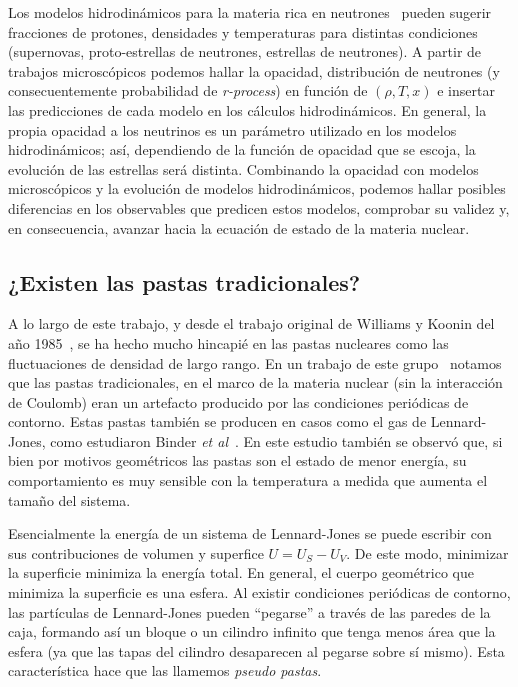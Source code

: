 Los modelos hidrodinámicos para la materia rica en neutrones~\cite{ruffert_coalescing_1995, mezzacappa_investigation_1998, geppert_temperature_2004, woosley_physics_2005, liebendorfer_supernova_2005} pueden sugerir fracciones de protones, densidades y temperaturas para distintas condiciones (supernovas, proto-estrellas de neutrones, estrellas de neutrones).
A partir de trabajos microscópicos podemos hallar la opacidad, distribución de neutrones (y consecuentemente probabilidad de \emph{r-process}) en función de $(\rho, T, x)$ e insertar las predicciones de cada modelo en los cálculos hidrodinámicos.
En general, la propia opacidad a los neutrinos es un parámetro utilizado en los modelos hidrodinámicos; así, dependiendo de la función de opacidad que se escoja, la evolución de las estrellas será distinta.
Combinando la opacidad con modelos microscópicos y la evolución de modelos hidrodinámicos, podemos hallar posibles diferencias en los observables que predicen estos modelos, comprobar su validez y, en consecuencia, avanzar hacia la ecuación de estado de la materia nuclear.


\subsection{¿Existen las pastas tradicionales?}

A lo largo de este trabajo, y desde el trabajo original de Williams y Koonin del año 1985~\cite{williams_sub-saturation_1985}, se ha hecho mucho hincapié en las pastas nucleares como las fluctuaciones de densidad de largo rango.
En un trabajo de este grupo~\cite{gimenez_molinelli_finite_2015} notamos que las pastas tradicionales, en el marco de la materia nuclear (sin la interacción de Coulomb) eran un artefacto producido por las condiciones periódicas de contorno.
Estas pastas también se producen en casos como el gas de Lennard-Jones, como estudiaron Binder \emph{et al}~\cite{binder_beyond_2012}.
En este estudio también se observó que, si bien por motivos geométricos las pastas son el estado de menor energía, su comportamiento es muy sensible con la temperatura a medida que aumenta el tamaño del sistema.

Esencialmente la energía de un sistema de Lennard-Jones se puede escribir con sus contribuciones de volumen y superfice $U = U_S - U_V$.
De este modo, minimizar la superficie minimiza la energía total.
En general, el cuerpo geométrico que minimiza la superficie es una esfera.
Al existir condiciones periódicas de contorno, las partículas de Lennard-Jones pueden ``pegarse'' a través de las paredes de la caja, formando así un bloque o un cilindro infinito que tenga menos área que la esfera (ya que las tapas del cilindro desaparecen al pegarse sobre sí mismo).
Esta característica hace que las llamemos \emph{pseudo pastas}.

